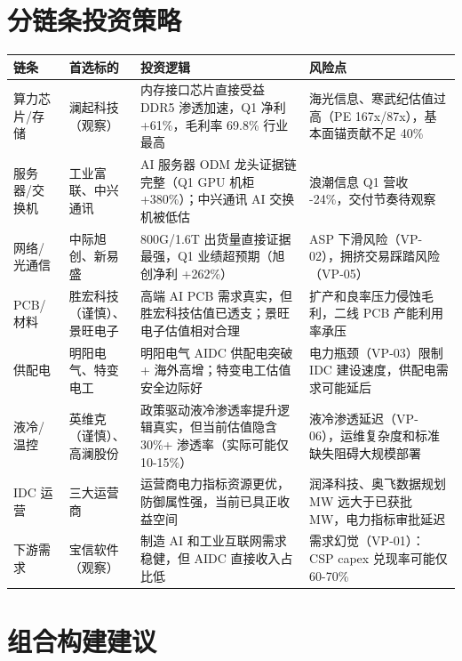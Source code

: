 \section{分链条投资策略}

\begin{exhibitbox}[八大链条投资策略矩阵]
\begin{tabularx}{\textwidth}{L{2.2cm}L{2.5cm}X X}
\toprule
\textbf{链条} & \textbf{首选标的} & \textbf{投资逻辑} & \textbf{风险点}\\
\midrule
算力芯片/存储 & 澜起科技（观察） & 内存接口芯片直接受益 DDR5 渗透加速，Q1 净利 +61\%，毛利率 69.8\% 行业最高 & 海光信息、寒武纪估值过高（PE 167x/87x），基本面锚贡献不足 40\%\\
服务器/交换机 & 工业富联、中兴通讯 & AI 服务器 ODM 龙头证据链完整（Q1 GPU 机柜 +380\%）；中兴通讯 AI 交换机被低估 & 浪潮信息 Q1 营收 -24\%，交付节奏待观察\\
网络/光通信 & 中际旭创、新易盛 & 800G/1.6T 出货量直接证据最强，Q1 业绩超预期（旭创净利 +262\%） & ASP 下滑风险（VP-02），拥挤交易踩踏风险（VP-05）\\
PCB/材料 & 胜宏科技（谨慎）、景旺电子 & 高端 AI PCB 需求真实，但胜宏科技估值已透支；景旺电子估值相对合理 & 扩产和良率压力侵蚀毛利，二线 PCB 产能利用率承压\\
供配电 & 明阳电气、特变电工 & 明阳电气 AIDC 供配电突破 + 海外高增；特变电工估值安全边际好 & 电力瓶颈（VP-03）限制 IDC 建设速度，供配电需求可能延后\\
液冷/温控 & 英维克（谨慎）、高澜股份 & 政策驱动液冷渗透率提升逻辑真实，但当前估值隐含 30\%+ 渗透率（实际可能仅 10-15\%） & 液冷渗透延迟（VP-06），运维复杂度和标准缺失阻碍大规模部署\\
IDC 运营 & 三大运营商 & 运营商电力指标资源更优，防御属性强，当前已具正收益空间 & 润泽科技、奥飞数据规划 MW 远大于已获批 MW，电力指标审批延迟\\
下游需求 & 宝信软件（观察） & 制造 AI 和工业互联网需求稳健，但 AIDC 直接收入占比低 & 需求幻觉（VP-01）：CSP capex 兑现率可能仅 60-70\%\\
\bottomrule
\end{tabularx}
\end{exhibitbox}

\section{组合构建建议}

